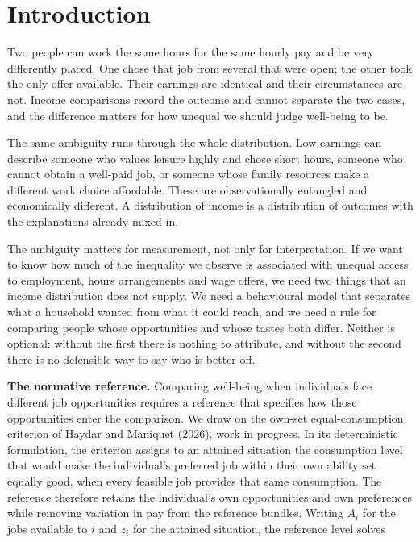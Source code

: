 \documentclass[11pt,a4paper]{article}
\begin{document}
\section{Introduction}\label{introduction}

Two people can work the same hours for the same hourly pay and be very differently placed. One chose that job from several that were open; the other took the only offer available. Their earnings are identical and their circumstances are not. Income comparisons record the outcome and cannot separate the two cases, and the difference matters for how unequal we should judge well-being to be.

The same ambiguity runs through the whole distribution. Low earnings can describe someone who values leisure highly and chose short hours, someone who cannot obtain a well-paid job, or someone whose family resources make a different work choice affordable. These are observationally entangled and economically different. A distribution of income is a distribution of outcomes with the explanations already mixed in.

The ambiguity matters for measurement, not only for interpretation. If we want to know how much of the inequality we observe is associated with unequal access to employment, hours arrangements and wage offers, we need two things that an income distribution does not supply. We need a behavioural model that separates what a household wanted from what it could reach, and we need a rule for comparing people whose opportunities and whose tastes both differ. Neither is optional: without the first there is nothing to attribute, and without the second there is no defensible way to say who is better off.

\textbf{The normative reference.} Comparing well-being when individuals face different job opportunities requires a reference that specifies how those opportunities enter the comparison. We draw on the own-set equal-consumption criterion of Haydar and Maniquet (2026), work in progress. In its deterministic formulation, the criterion assigns to an attained situation the consumption level that would make the individual's preferred job within their own ability set equally good, when every feasible job provides that same consumption. The reference therefore retains the individual's own opportunities and own preferences while removing variation in pay from the reference bundles. Writing \(A_i\) for the jobs available to \(i\) and \(z_i\) for the attained situation, the reference level solves
\end{document}
